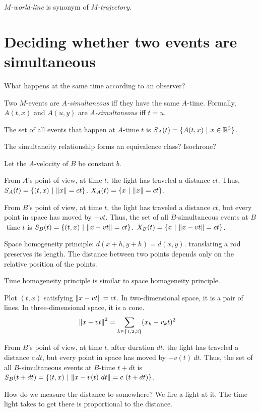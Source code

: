 \emph{\(M\)-world-line} is synonym of \emph{\(M\)-trajectory}.

\section{Deciding whether two events are simultaneous}

What happens at the same time according to an observer?

Two \(M\)-events are \emph{\(A\)-simultaneous} iff they have the same \(A\)-time.
Formally, $A(t,x)$ and $A(u,y)$ are \emph{\(A\)-simultaneous} iff $t = u$.

The set of all events that happen at \(A\)-time \(t\) is \(S_A(t) = \{ A(t,x) ~|~ x \in \mathbb{R}^3 \}\).

The simultaneity relationship forms an equivalence class?
Isochrone?

Let the \(A\)-velocity of \(B\) be constant \(b\).

From \(A\)'s point of view, at time \(t\),
the light has traveled a distance \(ct\).
Thus, \(S_A(t) = \{ (t,x) ~|~ \norm{x} = ct \}\).
\(X_A(t) = \{ x ~|~ \norm{x} = ct \}\).

From \(B\)'s point of view, at time \(t\),
the light has traveled a distance \(ct\),
but every point in space has moved by \(-vt\).
Thus, the set of all \(B\)-simultaneous events at \(B\)-time \(t\) is
\( S_B(t) = \{ (t,x) ~|~ \norm{x - vt} = ct \} \).
\(X_B(t) = \{ x ~|~ \norm{x - vt} = ct \}\).

Space homogeneity principle:
\(d(x+h,y+h) = d(x,y)\).
translating a rod preserves its length.
The distance between two points depends only on the relative position of the points.

Time homogeneity principle is similar to space homogeneity principle.

Plot \((t,x)\) satisfying \(\norm{x-vt} = ct\).
In two-dimensional space, it is a pair of lines.
In three-dimensional space, it is a cone.
\begin{align*}
    \norm{x-vt}^2 &= \sum_{k \in \{1,2,3\}} (x_k - v_kt)^2
\end{align*}

From \(B\)'s point of view, at time \(t\),
after duration \(dt\),
the light has traveled a distance \(c~dt\),
but every point in space has moved by \(-v(t)~dt\).
Thus, the set of all \(B\)-simultaneous events at \(B\)-time \(t + dt\) is
\( S_B(t + dt) = \{ (t,x) ~|~ \norm{x - v(t)~dt} = c~(t + dt) \} \).

How do we measure the distance to somewhere?
We fire a light at it.
The time light takes to get there is proportional to the distance.

